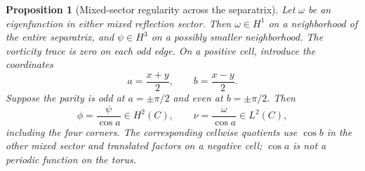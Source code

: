 \documentclass[reqno,11pt]{amsart}
\numberwithin{equation}{section}
\newtheorem{proposition}[theorem]{Proposition}
\theoremstyle{remark}
\begin{document}
\begin{proposition}[Mixed-sector regularity across the separatrix]
\label{prop:mixed-quotient-domain}
Let $\omega$ be an eigenfunction in either mixed reflection sector.
Then $\omega\in H^1$ on a neighborhood of the entire separatrix,
and $\psi\in H^3$ on a possibly smaller neighborhood.
The vorticity trace is zero on each odd edge.
On a positive cell, introduce the coordinates
\[
 a=\frac{x+y}{2},\qquad b=\frac{x-y}{2}.
\]
Suppose the parity is odd at $a=\pm\pi/2$ and even at
$b=\pm\pi/2$. Then
\begin{equation}
 \phi=\frac{\psi}{\cos a}\in H^2(C),\qquad
 \nu=\frac{\omega}{\cos a}\in L^2(C),
 \label{eq:mixed-one-factor-domain}
\end{equation}
including the four corners. The corresponding cellwise quotients
use $\cos b$ in the other mixed sector and translated factors on
a negative cell; $\cos a$ is not a periodic function on the torus.
\end{proposition}
\end{document}
